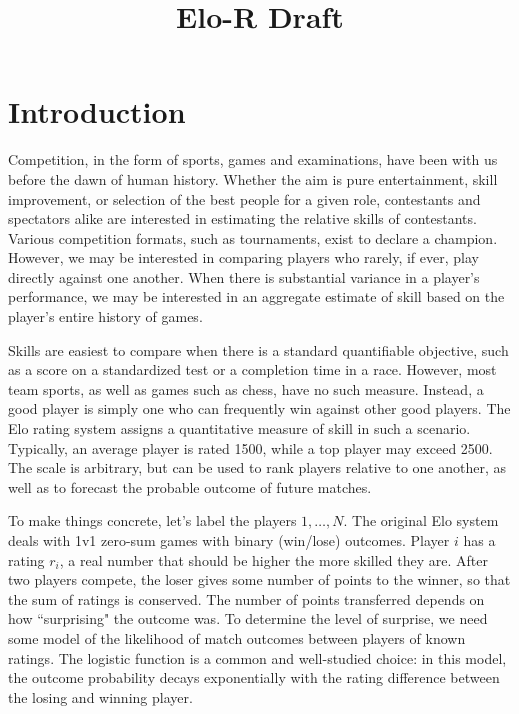 \documentclass{article}
\title{Elo-R Draft}
\begin{document}
\maketitle

\section{Introduction}

Competition, in the form of sports, games and examinations, have been with us before the dawn of human history. Whether the aim is pure entertainment, skill improvement, or selection of the best people for a given role, contestants and spectators alike are interested in estimating the relative skills of contestants. Various competition formats, such as tournaments, exist to declare a champion. However, we may be interested in comparing players who rarely, if ever, play directly against one another. When there is substantial variance in a player's performance, we may be interested in an aggregate estimate of skill based on the player's entire history of games.

Skills are easiest to compare when there is a standard quantifiable objective, such as a score on a standardized test or a completion time in a race.  However, most team sports, as well as games such as chess, have no such measure. Instead, a good player is simply one who can frequently win against other good players. The Elo rating system assigns a quantitative measure of skill in such a scenario. Typically, an average player is  rated 1500, while a top player may exceed 2500. The scale is arbitrary, but can be used to rank players relative to one another, as well as to forecast the probable outcome of future matches.

To make things concrete, let's label the players $1,\ldots,N$. The original Elo system deals with 1v1 zero-sum games with binary (win/lose) outcomes. Player $i$ has a rating $r_i$, a real number that should be higher the more skilled they are. After two players compete, the loser gives some number of points to the winner, so that the sum of ratings is conserved. The number of points transferred depends on how ``surprising" the outcome was. To determine the level of surprise, we need some model of the likelihood of match outcomes between players of known ratings. The logistic function is a common and well-studied choice: in this model, the outcome probability decays exponentially with the rating difference between the losing and winning player.
\end{document}
